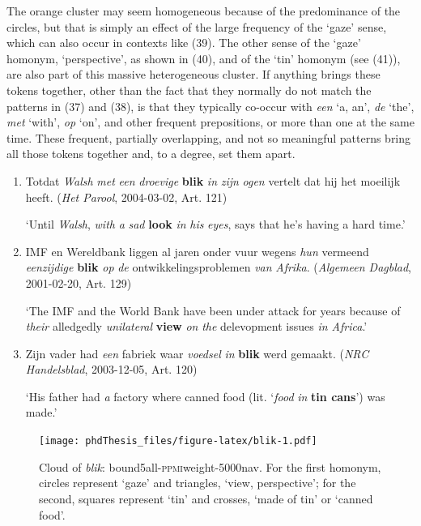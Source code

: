 \documentclass[
]{book}
\begin{document}
The orange cluster may seem homogeneous because of the predominance of the circles, but that is simply an effect of the large frequency of the `gaze' sense, which can also occur in contexts like (39). The other sense of the `gaze' homonym, `perspective', as shown in (40), and of the `tin' homonym (see (41)), are also part of this massive heterogeneous cluster. If anything brings these tokens together, other than the fact that they normally do not match the patterns in (37) and (38), is that they typically co-occur with \emph{een} `a, an', \emph{de} `the', \emph{met} `with', \emph{op} `on', and other frequent prepositions, or more than one at the same time. These frequent, partially overlapping, and not so meaningful patterns bring all those tokens together and, to a degree, set them apart.

\begin{enumerate}
\def\labelenumi{(\arabic{enumi})}
\setcounter{enumi}{38}
\item
  Totdat \emph{Walsh} \emph{met} \emph{een} \emph{droevige} \textbf{blik} \emph{in} \emph{zijn} \emph{ogen} vertelt dat hij het moeilijk heeft. (\emph{Het Parool}, 2004-03-02, Art. 121)

  `Until \emph{Walsh}, \emph{with} \emph{a} \emph{sad} \textbf{look} \emph{in} \emph{his} \emph{eyes}, says that he's having a hard time.'
\item
  IMF en Wereldbank liggen al jaren onder vuur wegens \emph{hun} vermeend \emph{eenzijdige} \textbf{blik} \emph{op} \emph{de} ontwikkelingsproblemen \emph{van} \emph{Afrika}. (\emph{Algemeen Dagblad}, 2001-02-20, Art. 129)

  `The IMF and the World Bank have been under attack for years because of \emph{their} alledgedly \emph{unilateral} \textbf{view} \emph{on} \emph{the} delevopment issues \emph{in Africa}.'
\item
  Zijn vader had \emph{een} fabriek waar \emph{voedsel} \emph{in} \textbf{blik} werd gemaakt. (\emph{NRC Handelsblad}, 2003-12-05, Art. 120)

  `His father had \emph{a} factory where canned food (lit. `\emph{food} \emph{in} \textbf{tin cans}') was made.'
\end{enumerate}



\begin{figure}
\centering
\texttt{[image: phdThesis\_files/figure-latex/blik-1.pdf]}
\caption{\label{fig:blik}Cloud of \emph{blik}: bound5all-\textsc{ppmi}weight-\textsc{5000}nav. For the first homonym, circles represent `gaze' and triangles, `view, perspective'; for the second, squares represent `tin' and crosses, `made of tin' or `canned food'.}
\end{figure}
\end{document}
